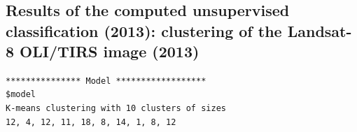 \documentclass[atmosphere,article,submit,pdftex,moreauthors]{Definitions/mdpi}
\begin{document}
\appendixstart
\appendix
\section[\appendixname~\thesection]{}
\subsection[\appendixname~\thesubsection]{Results of the computed unsupervised classification (2013): clustering of the Landsat-8 OLI/TIRS image (2013)}

\begin{small}
\begin{verbatim}
*************** Model ******************
$model
K-means clustering with 10 clusters of sizes 
12, 4, 12, 11, 18, 8, 14, 1, 8, 12


\end{verbatim}
\end{small}
\end{document}

